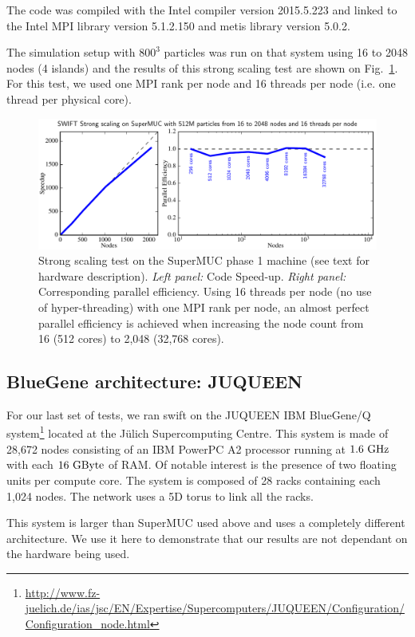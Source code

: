 \documentclass{sig-alternate-05-2015}
\newcommand{\swift}{{\sc swift}\xspace}
\begin{document}
The code was compiled with the Intel compiler version \textsc{2015.5.223} and
linked to the Intel MPI library version \textsc{5.1.2.150} and metis library
version \textsc{5.0.2}.

The simulation setup with $800^3$ particles was run on that system using 16 to
2048 nodes (4 islands) and the results of this strong scaling test are shown on
Fig.~\ref{fig:superMUC}. For this test, we used one MPI rank per node and 16
threads per node (i.e. one thread per physical core).

\begin{figure}
\centering
\includegraphics[width=\textwidth]{Figures/scalingSuperMUC}
\caption{Strong scaling test on the SuperMUC phase 1 machine (see text
  for hardware description). \textit{Left panel:} Code
  Speed-up. \textit{Right panel:} Corresponding parallel efficiency.
  Using 16 threads per node (no use of hyper-threading) with one MPI rank
  per node, an almost perfect parallel efficiency is achieved when
  increasing the node count from 16 (512 cores) to 2,048 (32,768
  cores).
  \label{fig:superMUC}}
\end{figure}


\subsection{BlueGene architecture: JUQUEEN}

For our last set of tests, we ran \swift on the JUQUEEN IBM BlueGene/Q
system\footnote{\url{http://www.fz-juelich.de/ias/jsc/EN/Expertise/Supercomputers/JUQUEEN/Configuration/Configuration_node.html}}
located at the J\"ulich Supercomputing Centre. This system is made of 28,672
nodes consisting of an IBM PowerPC A2 processor running at $1.6~\rm{GHz}$ with
each $16~\rm{GByte}$ of RAM. Of notable interest is the presence of two floating
units per compute core. The system is composed of 28 racks containing each 1,024
nodes. The network uses a 5D torus to link all the racks.

This system is larger than SuperMUC used above and uses a completely different
architecture. We use it here to demonstrate that our results are not dependant
on the hardware being used.
\end{document}
